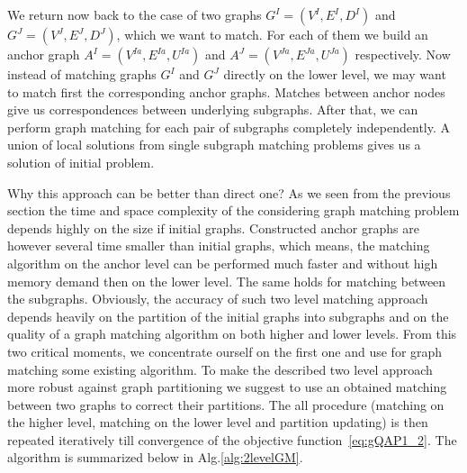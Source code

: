 We return now back to the case of two graphs $G^I=(V^I,E^I,D^I)$ and $G^J=(V^J,E^J,D^J)$, which we want to match. 
For each of them we build an anchor graph $A^I=(V^{Ia},E^{Ia},U^{Ia})$ and $A^J=(V^{Ja},E^{Ja},U^{Ja})$ respectively.
Now instead of matching graphs $G^I$ and $G^J$ directly on the lower level, we may want to match first the corresponding anchor graphs. Matches between anchor nodes give us correspondences between underlying subgraphs. After that, we can perform graph matching for each pair of subgraphs completely independently. A union of local solutions from single subgraph matching problems gives us a solution of initial problem. 

Why this approach can be better than direct one? As we seen from the previous section the time and space complexity of the considering graph matching problem depends highly on the size if initial graphs. Constructed anchor graphs are however several time smaller than initial graphs, which means, the matching algorithm on the anchor level can be performed much faster and without high memory demand then on the lower level. The same holds for matching between the subgraphs.
Obviously, the accuracy of such two level matching approach depends heavily on the partition of the initial graphs into subgraphs and on the quality of a graph matching algorithm on both higher and lower levels. From this two critical moments, we concentrate ourself on the first one and use for graph matching some existing algorithm. To make the described two level approach more robust against graph partitioning we suggest to use an obtained matching between two graphs to correct their partitions. The all procedure (matching on the higher level, matching on the lower level and partition updating) is then repeated iteratively till convergence of the objective function~\eqref{eq:gQAP1_2}. The algorithm is summarized below in Alg.\ref{alg:2levelGM}.

